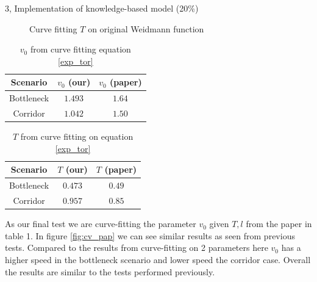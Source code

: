 \begin{task}{3, Implementation of knowledge-based model (20\%)}
\begin{figure}[H]
\centering
{}
\caption{Curve fitting $T$ on original Weidmann function}
\label{fig:cv}
\end{figure}

\begin{table}[H]
\centering
\begin{tabular}{ |c|c|c| }
\hline
Scenario & $v_0$ (our) & $v_0$ (paper)\\
\hline
Bottleneck & $1.493$ & $1.64$\\
\hline
Corridor & $1.042$ & $1.50$\\
\hline
\end{tabular}
\caption{$v_0$ from curve fitting equation \ref{exp_tor}}
\label{Tab:v0cv}
\end{table}

\begin{table}[H]
\centering
\begin{tabular}{ |c|c|c| }
\hline
Scenario & $T$ (our) & $T$ (paper)\\
\hline
Bottleneck & $0.473$ & $0.49$\\
\hline
Corridor & $0.957$ & $0.85$\\
\hline
\end{tabular}
\caption{$T$ from curve fitting on equation \ref{exp_tor}}
\label{Tab:tcv}
\end{table}

As our final test we are curve-fitting the parameter $v_0$ given $T, l$ from the paper \cite{tordeux2020prediction} in table 1. In figure \ref{fig:cv_pap} we can see similar results as seen from previous tests. Compared to the results from curve-fitting on 2 parameters here $v_0$ has a higher speed in the bottleneck scenario and lower speed the corridor case. Overall the results are similar to the tests performed previously.


\end{task}
